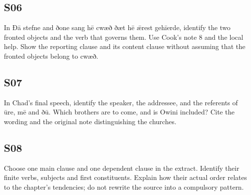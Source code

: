 \par\begin{minipage}{\linewidth}\raggedright
\subsection*{S06}

In Ðā stefne and ðone sang hē cwæð ðæt hē ǣrest gehīerde, identify the two fronted objects and the verb that governs them. Use Cook’s note 8 and the local help. Show the reporting clause and its content clause without assuming that the fronted objects belong to cwæð.

\end{minipage}\par\addvspace{4pt}

\par\begin{minipage}{\linewidth}\raggedright
\subsection*{S07}

In Chad’s final speech, identify the speaker, the addressee, and the referents of ūre, mē and ðū. Which brothers are to come, and is Owini included? Cite the wording and the original note distinguishing the churches.

\end{minipage}\par\addvspace{4pt}

\par\begin{minipage}{\linewidth}\raggedright
\subsection*{S08}

Choose one main clause and one dependent clause in the extract. Identify their finite verbs, subjects and first constituents. Explain how their actual order relates to the chapter’s tendencies; do not rewrite the source into a compulsory pattern.

\end{minipage}\par\addvspace{4pt}

